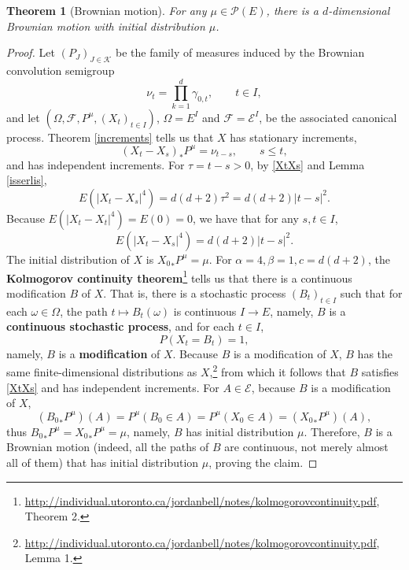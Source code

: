\documentclass{article}
\newtheorem{theorem}{Theorem}
\theoremstyle{definition}
\begin{document}
\begin{theorem}[Brownian motion]
For any $\mu \in \mathscr{P}(E)$, there is a $d$-dimensional Brownian motion with initial distribution $\mu$.
\label{brownian}
\end{theorem}
\begin{proof}
Let $(P_J)_{J \in \mathscr{K}}$ be the family of measures induced by the Brownian convolution semigroup
\[
\nu_t = \prod_{k=1}^d \gamma_{0,t}, \qquad t \in I,
\]
and let $(\Omega,\mathscr{F},P^\mu,(X_t)_{t \in I})$, $\Omega=E^I$ and $\mathscr{F}=\mathscr{E}^I$,
be the associated canonical process.
Theorem \ref{increments} tells us that $X$ has stationary increments,
\begin{equation}
(X_t-X_s)_*P^\mu = \nu_{t-s},\qquad s \leq t,
\label{XtXs}
\end{equation}
and has independent increments. 
For $\tau=t-s>0$, by \eqref{XtXs} and 
Lemma \ref{isserlis},
\[
E(|X_t-X_s|^4) = d(d+2) \tau^2 = d(d+2) |t-s|^2.
\]
Because $E(|X_t-X_t|^4)=E(0)=0$, we have that for any $s,t \in I$,
\[
E(|X_t-X_s|^4)  = d(d+2)|t-s|^2.
\]
The initial distribution of $X$ is ${X_0}_*P^\mu = \mu$.
For $\alpha=4, \beta=1, c=d(d+2)$, the \textbf{Kolmogorov continuity theorem}\footnote{\url{http://individual.utoronto.ca/jordanbell/notes/kolmogorovcontinuity.pdf},
Theorem 2.} tells us that there is a continuous modification $B$ of $X$. That is, there is a stochastic process $(B_t)_{t \in I}$
such that for each $\omega \in \Omega$, the path $t \mapsto B_t(\omega)$ is continuous 
$I \to E$, namely, $B$ is a \textbf{continuous stochastic process}, and
for each $t \in I$, 
\[
P(X_t = B_t)=1,
\]
namely, $B$ is a \textbf{modification} of $X$. Because $B$ is a modification of $X$, $B$ has the same finite-dimensional distributions as $X$,\footnote{\url{http://individual.utoronto.ca/jordanbell/notes/kolmogorovcontinuity.pdf}, Lemma 1.} from which it follows that $B$ satisfies \eqref{XtXs} and has independent increments. 
For $A \in \mathscr{E}$, because $B$ is a modification of $X$,
\[
({B_0}_*P^\mu)(A) = P^\mu(B_0 \in A) = P^\mu(X_0 \in A) = ({X_0}_*P^\mu)(A),
\]
thus ${B_0}_*P^\mu = {X_0}_*P^\mu = \mu$, namely, $B$ has initial distribution $\mu$.
Therefore, $B$ is a Brownian motion (indeed, all the paths of $B$ are continuous, not merely almost all of them) that has initial distribution
$\mu$, proving the claim.
\end{proof}
\end{document}
